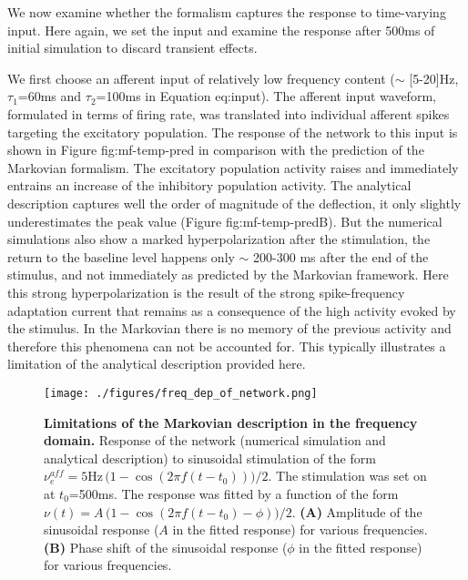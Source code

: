 \documentclass[8pt, colorlinks, a4paper]{article}
\renewcommand\ref{}
\begin{document}
We now examine whether the formalism captures the response to
time-varying input. Here again, we set the input and examine the
response after 500ms of initial simulation to discard transient
effects.

We first choose an afferent input of relatively low frequency content
(\(\sim\) [5-20]Hz, \( \tau_1 \)=60ms and \( \tau_2 \)=100ms in
Equation \ref{eq:input}). The afferent input waveform, formulated in
terms of firing rate, was translated into individual afferent spikes
targeting the excitatory population. The response of the network to
this input is shown in Figure \ref{fig:mf-temp-pred} in comparison
with the prediction of the Markovian formalism. The excitatory
population activity raises and immediately entrains an increase of the
inhibitory population activity. The analytical description captures
well the order of magnitude of the deflection, it only slightly
underestimates the peak value (Figure \ref{fig:mf-temp-pred}B). But
the numerical simulations also show a marked hyperpolarization after
the stimulation, the return to the baseline level happens only
\(\sim\) 200-300 ms after the end of the stimulus, and not immediately
as predicted by the Markovian framework. Here this strong
hyperpolarization is the result of the strong spike-frequency
adaptation current that remains as a consequence of the high activity
evoked by the stimulus. In the Markovian there is no memory of the
previous activity and therefore this phenomena can not be accounted
for. This typically illustrates a limitation of the analytical
description provided here.

\begin{figure}[tb!]
\centering
\texttt{[image: ./figures/freq\_dep\_of\_network.png]}
\caption{\label{fig:mf-freq-dep}\textbf{Limitations of the Markovian description in the frequency domain.} Response of the network (numerical simulation and analytical description) to sinusoidal stimulation of the form \(\nu_e^{aff} = 5\mathrm{Hz} \, \big(1-\cos(2 \pi f (t-t_0))\big)/2\). The stimulation was set on at \(t_0\)=500ms. The response was fitted by a function of the form  \(\nu(t) = A \, \big(1-\cos(2 \pi f (t-t_0) - \phi)\big)/2\). \textbf{(A)} Amplitude of the sinusoidal response (\(A\) in the fitted response) for various frequencies. \textbf{(B)} Phase shift of the sinusoidal response (\(\phi\) in the fitted response) for various frequencies.}
\end{figure}
\end{document}
